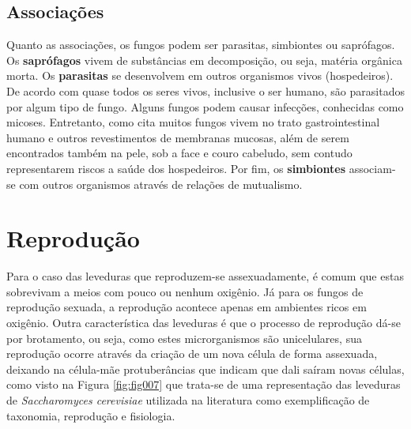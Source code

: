 \documentclass[tcc2]{classe_uftex/uftex}
\begin{document}
    \subsection{Associações}
    \label{subsec:associacoes}
    Quanto as associações, os fungos podem ser parasitas, simbiontes ou saprófagos. Os \textbf{saprófagos} vivem de substâncias em decomposição, ou seja, matéria orgânica morta. Os \textbf{parasitas} se desenvolvem em outros organismos vivos (hospedeiros). De acordo com  quase todos os seres vivos, inclusive o ser humano, são parasitados por algum tipo de fungo. Alguns fungos podem causar infecções, conhecidas como micoses. Entretanto, como cita  muitos fungos vivem no trato gastrointestinal humano e outros revestimentos de membranas mucosas, além de serem encontrados também na pele, sob a face e couro cabeludo, sem contudo representarem riscos a saúde dos hospedeiros. Por fim, os \textbf{simbiontes} associam-se com outros organismos através de relações de mutualismo.
    
\section{Reprodução}
\label{sec:reproducao}
Para o caso das leveduras que reproduzem-se assexuadamente, é comum que estas sobrevivam a meios com pouco ou nenhum oxigênio. Já para os fungos de reprodução sexuada, a reprodução acontece apenas em ambientes ricos em oxigênio. Outra característica das leveduras é que o processo de reprodução dá-se por brotamento, ou seja, como estes microrganismos são unicelulares, sua reprodução ocorre através da criação de um nova célula de forma assexuada, deixando na célula-mãe protuberâncias que indicam que dali saíram novas células, como visto na Figura \ref{fig:fig007} que trata-se de uma representação das leveduras de \emph{Saccharomyces cerevisiae} utilizada na literatura como exemplificação de taxonomia, reprodução e fisiologia.



\end{document}
